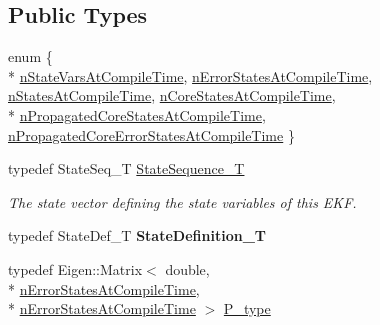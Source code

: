 \subsection*{Public Types}
\begin{DoxyCompactItemize}
\item 
enum \{ \\*
\hyperlink{structmsf__core_1_1GenericState__T_a20545d9aacd8f84bc1a97a873310cd5fabae0f6113b2fd3bd1e55a7fd0a3e8534}{n\-State\-Vars\-At\-Compile\-Time}, 
\hyperlink{structmsf__core_1_1GenericState__T_a20545d9aacd8f84bc1a97a873310cd5fab0136c5805e4e8d75677885fcaad5901}{n\-Error\-States\-At\-Compile\-Time}, 
\hyperlink{structmsf__core_1_1GenericState__T_a20545d9aacd8f84bc1a97a873310cd5faf75f7ae9223cdbc573d043e82f5843bd}{n\-States\-At\-Compile\-Time}, 
\hyperlink{structmsf__core_1_1GenericState__T_a20545d9aacd8f84bc1a97a873310cd5fabd9ce322dcc236ba424c7435e37a34f3}{n\-Core\-States\-At\-Compile\-Time}, 
\\*
\hyperlink{structmsf__core_1_1GenericState__T_a20545d9aacd8f84bc1a97a873310cd5fa20a7211e99e3848fc20fce6cd9834c91}{n\-Propagated\-Core\-States\-At\-Compile\-Time}, 
\hyperlink{structmsf__core_1_1GenericState__T_a20545d9aacd8f84bc1a97a873310cd5faa076b31f0a4176856a0ddc0556801725}{n\-Propagated\-Core\-Error\-States\-At\-Compile\-Time}
 \}
\item 
typedef State\-Seq\-\_\-\-T \hyperlink{structmsf__core_1_1GenericState__T_a75fe70f7c7517dbf7d4c91b75b08a1dd}{State\-Sequence\-\_\-\-T}
\begin{DoxyCompactList}\small\item\em The state vector defining the state variables of this E\-K\-F. \end{DoxyCompactList}\item 
\hypertarget{structmsf__core_1_1GenericState__T_a9a7d65b0325658ab07b81960a3ed4604}{typedef State\-Def\-\_\-\-T {\bfseries State\-Definition\-\_\-\-T}}\label{structmsf__core_1_1GenericState__T_a9a7d65b0325658ab07b81960a3ed4604}

\item 
\hypertarget{structmsf__core_1_1GenericState__T_ab6d971027f43219a480e910392b665c8}{typedef Eigen\-::\-Matrix$<$ double, \\*
\hyperlink{structmsf__core_1_1GenericState__T_a20545d9aacd8f84bc1a97a873310cd5fab0136c5805e4e8d75677885fcaad5901}{n\-Error\-States\-At\-Compile\-Time}, \\*
\hyperlink{structmsf__core_1_1GenericState__T_a20545d9aacd8f84bc1a97a873310cd5fab0136c5805e4e8d75677885fcaad5901}{n\-Error\-States\-At\-Compile\-Time} $>$ \hyperlink{structmsf__core_1_1GenericState__T_ab6d971027f43219a480e910392b665c8}{P\-\_\-type}}\label{structmsf__core_1_1GenericState__T_ab6d971027f43219a480e910392b665c8}


\end{DoxyCompactItemize}
